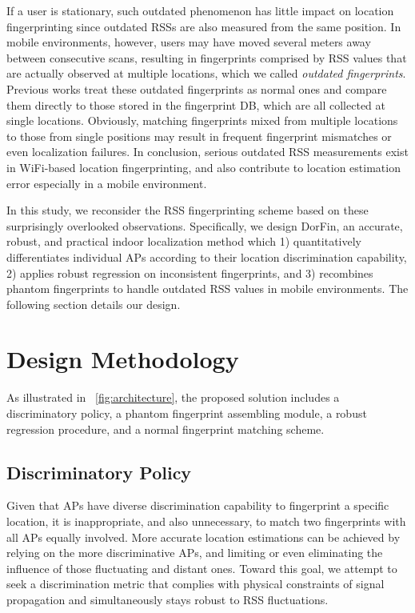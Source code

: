 \documentclass[10pt,conference,compsocconf,letterpaper]{./sty/IEEEtran}
\newcommand{\term}[1]{{\it #1}}
\def\sysname{DorFin}
\begin{document}
If a user is stationary, such outdated phenomenon has little impact on location fingerprinting since outdated RSSs are also measured from the same position. In mobile environments, however, users may have moved several meters away between consecutive scans, resulting in fingerprints comprised by RSS values that are actually observed at multiple locations, which we called \term{outdated fingerprints}. Previous works treat these outdated fingerprints as normal ones and compare them directly to those stored in the fingerprint DB, which are all collected at single locations. Obviously, matching fingerprints mixed from multiple locations to those from single positions may result in frequent fingerprint mismatches or even localization failures. 
In conclusion, serious outdated RSS measurements exist in WiFi-based location fingerprinting, and also contribute to location estimation error especially in a mobile environment. 


In this study, we reconsider the RSS fingerprinting scheme based on these surprisingly overlooked observations. Specifically, we design \sysname, an accurate, robust, and practical indoor localization method which 1) quantitatively differentiates individual APs according to their location discrimination capability, 2) applies robust regression on inconsistent fingerprints, and 3) recombines phantom fingerprints to handle outdated RSS values in mobile environments. The following section details our design.





\section{Design Methodology}
\label{sec:design}

As illustrated in \figurename~\ref{fig:architecture}, the proposed solution includes a discriminatory policy, a phantom fingerprint assembling module, a robust regression procedure, and a normal fingerprint matching scheme. 


\subsection{Discriminatory Policy}

Given that APs have diverse discrimination capability to fingerprint a specific location, it is inappropriate, and also unnecessary, to match two fingerprints with all APs equally involved. More accurate location estimations can be achieved by relying on the more discriminative APs, and limiting or even eliminating the influence of those fluctuating and distant ones. Toward this goal, we attempt to seek a discrimination metric that complies with physical constraints of signal propagation and simultaneously stays robust to RSS fluctuations.
\end{document}
